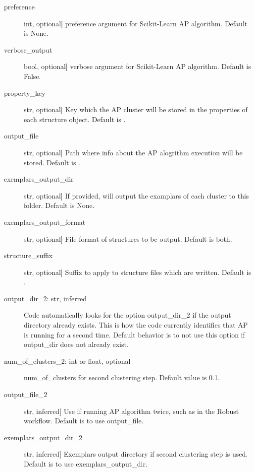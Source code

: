 \documentclass[letterpaper,10pt,english]{sphinxmanual}
\begin{document}
\begin{fulllineitems}
\begin{fulllineitems}
\begin{description}
\item[{preference}] \leavevmode{[}int, optional{]}
preference argument for Scikit-Learn AP algorithm. Default is None.

\item[{verbose\_output}] \leavevmode{[}bool, optional{]}
verbose argument for Scikit-Learn AP algorithm. Default is False.

\item[{property\_key}] \leavevmode{[}str, optional{]}
Key which the AP cluster will be stored in the properties of
each structure object. Default is .

\item[{output\_file}] \leavevmode{[}str, optional{]}
Path where info about the AP alogrithm execution will be stored.
Default is .

\item[{exemplars\_output\_dir}] \leavevmode{[}str, optional{]}
If provided, will output the examplars of each cluster to this
folder. Default is None.

\item[{exemplars\_output\_format}] \leavevmode{[}str, optional{]}
File format of structures to be output. Default is both.

\item[{structure\_suffix}] \leavevmode{[}str, optional{]}
Suffix to apply to structure files which are written.
Default is .

\item[{output\_dir\_2: str, inferred}] \leavevmode
Code automatically looks for the option output\_dir\_2 if the
output directory already exists. This is how the code currently
identifies that AP is running for a second time. Default behavior
is to not use this option if output\_dir does not already exist.

\item[{num\_of\_clusters\_2: int or float, optional}] \leavevmode
num\_of\_clusters for second clustering step. Default value is 0.1.

\item[{output\_file\_2}] \leavevmode{[}str, inferred{]}
Use if running AP algorithm twice, such as in the Robust workflow.
Default is to use output\_file.

\item[{exemplars\_output\_dir\_2}] \leavevmode{[}str, inferred{]}
Exemplars output directory if second clustering step is used.
Default is to use exemplars\_output\_dir.


\end{description}
\end{fulllineitems}
\end{fulllineitems}
\end{document}
